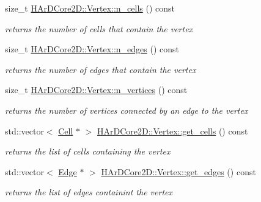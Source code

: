 \begin{DoxyCompactItemize}
\mbox{\label{group__Mesh_gaae4e6a646ff79f705428c9063736aee1}} 
size\+\_\+t \hyperlink{group__Mesh_gaae4e6a646ff79f705428c9063736aee1}{H\+Ar\+D\+Core2\+D\+::\+Vertex\+::n\+\_\+cells} () const
\begin{DoxyCompactList}\small\item\em returns the number of cells that contain the vertex \end{DoxyCompactList}\item 
\mbox{\label{group__Mesh_ga1d6d5233c4f95c862387b5961fef5a22}} 
size\+\_\+t \hyperlink{group__Mesh_ga1d6d5233c4f95c862387b5961fef5a22}{H\+Ar\+D\+Core2\+D\+::\+Vertex\+::n\+\_\+edges} () const
\begin{DoxyCompactList}\small\item\em returns the number of edges that contain the vertex \end{DoxyCompactList}\item 
\mbox{\label{group__Mesh_ga64033a69394a8fa757ca097407ab5e0a}} 
size\+\_\+t \hyperlink{group__Mesh_ga64033a69394a8fa757ca097407ab5e0a}{H\+Ar\+D\+Core2\+D\+::\+Vertex\+::n\+\_\+vertices} () const
\begin{DoxyCompactList}\small\item\em returns the number of vertices connected by an edge to the vertex \end{DoxyCompactList}\item 
\mbox{\label{group__Mesh_gaff000e01e8c4bd44162ae8b526950d31}} 
std\+::vector$<$ \hyperlink{classHArDCore2D_1_1Cell}{Cell} $\ast$ $>$ \hyperlink{group__Mesh_gaff000e01e8c4bd44162ae8b526950d31}{H\+Ar\+D\+Core2\+D\+::\+Vertex\+::get\+\_\+cells} () const
\begin{DoxyCompactList}\small\item\em returns the list of cells containing the vertex \end{DoxyCompactList}\item 
\mbox{\label{group__Mesh_ga4a43457a0b69df1db3f3892824c272bb}} 
std\+::vector$<$ \hyperlink{classHArDCore2D_1_1Edge}{Edge} $\ast$ $>$ \hyperlink{group__Mesh_ga4a43457a0b69df1db3f3892824c272bb}{H\+Ar\+D\+Core2\+D\+::\+Vertex\+::get\+\_\+edges} () const
\begin{DoxyCompactList}\small\item\em returns the list of edges containint the vertex \end{DoxyCompactList}\item 

\end{DoxyCompactItemize}
